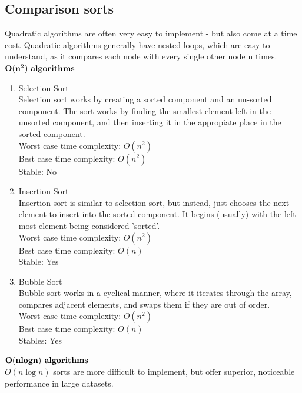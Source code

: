 \documentclass[14]{article}
\begin{document}
\subsection{Comparison sorts}
Quadratic algorithms are often very easy to implement - but also come at a time cost. Quadratic algorithms generally have 
nested loops, which are easy to understand, as it compares each node with every single other node n times. \\ 
$\mathbf{O(n^2) \text{ \textbf{algorithms}}}$
\begin{enumerate}
	\item Selection Sort \\ 
	Selection sort works by creating a sorted component and an un-sorted component. The sort works by finding the smallest
	element left in the unsorted component, and then inserting it in the appropiate place in the sorted component. \\ 
	Worst case time complexity: $O(n^2)$ \\ 
	Best case time complexity: $O(n^2)$ \\ 
	Stable: No \\ 
	\item Insertion Sort \\ 
	Insertion sort is similar to selection sort, but instead, just chooses the next element to insert into the 
	sorted component. It begins (usually) with the left most element being considered 'sorted'. \\ 
	Worst case time complexity: $O(n^2)$ \\ 
	Best case time complexity: $O(n)$ \\
	Stable: Yes \\ 
	\item Bubble Sort \\
	Bubble sort works in a cyclical manner, where it iterates through the array, compares adjacent elements,
	and swaps them if they are out of order. \\ 
	Worst case time complexity: $O(n^2)$ \\ 
	Best case time complexity: $O(n)$ \\
	Stables: Yes \\ 
\end{enumerate}
$\mathbf{O(nlogn) \text{\textbf{ algorithms}}}$ \\ 
$O(n\log n)$ sorts are more difficult to implement, but offer superior, noticeable performance in large datasets.
\end{document}
